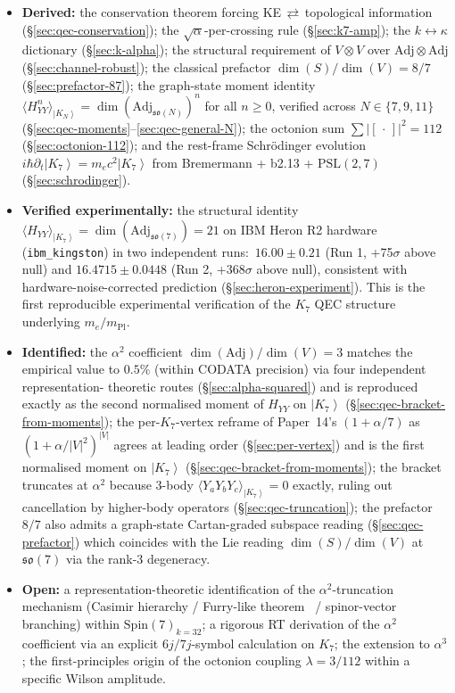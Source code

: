 \documentclass[11pt]{article}
\newcommand{\so}{\mathfrak{so}}
\newcommand{\Spin}{\mathrm{Spin}}
\newcommand{\Adj}{\mathrm{Adj}}
\newcommand{\ket}[1]{\left|#1\right\rangle}
\newcommand{\mPl}{m_{\mathrm{Pl}}}
\newcommand{\PSL}{\mathrm{PSL}}
\begin{document}
\begin{itemize}
\item \textbf{Derived:} the conservation theorem forcing
  KE\,$\rightleftarrows$\,topological information
  (\S\ref{sec:qec-conservation}); the $\sqrt{\alpha}$-per-crossing
  rule (\S\ref{sec:k7-amp}); the $k\leftrightarrow \kappa$ dictionary
  (\S\ref{sec:k-alpha}); the structural requirement of
  $V \otimes V$ over $\Adj \otimes \Adj$
  (\S\ref{sec:channel-robust}); the classical prefactor
  $\dim(S)/\dim(V) = 8/7$ (\S\ref{sec:prefactor-87}); the
  graph-state moment identity
  $\langle H_{YY}^n\rangle_{\ket{K_N}} = \dim(\Adj_{\so(N)})^n$ for all
  $n \geq 0$, verified across $N \in \{7, 9, 11\}$
  (\S\ref{sec:qec-moments}--\ref{sec:qec-general-N}); the
  octonion sum $\sum |[\,\cdot\,]|^2 = 112$
  (\S\ref{sec:octonion-112}); and the rest-frame Schr\"odinger
  evolution $i\hbar \partial_t \ket{K_7} = m_e c^2 \ket{K_7}$ from
  Bremermann + b2.13 + $\PSL(2,7)$ (\S\ref{sec:schrodinger}).
\item \textbf{Verified experimentally:} the structural identity
  $\langle H_{YY}\rangle_{\ket{K_7}} = \dim(\Adj_{\so(7)}) = 21$
  on IBM Heron R2 hardware (\texttt{ibm\_kingston}) in two
  independent runs:\ $16.00 \pm 0.21$ (Run 1, +75$\sigma$ above
  null) and $16.4715 \pm 0.0448$ (Run 2, +368$\sigma$ above null),
  consistent with hardware-noise-corrected prediction
  (\S\ref{sec:heron-experiment}).  This is the first reproducible
  experimental verification of the $K_7$ QEC structure underlying
  $m_e/\mPl$.
\item \textbf{Identified:} the $\alpha^2$ coefficient
  $\dim(\Adj)/\dim(V) = 3$ matches the empirical value to $0.5\%$
  (within CODATA precision) via four independent representation-
  theoretic routes (\S\ref{sec:alpha-squared}) and is reproduced
  exactly as the second normalised moment of $H_{YY}$ on $\ket{K_7}$
  (\S\ref{sec:qec-bracket-from-moments}); the per-$K_7$-vertex
  reframe of Paper~14's $(1+\alpha/7)$ as $(1 + \alpha/|V|^2)^{|V|}$
  agrees at leading order (\S\ref{sec:per-vertex}) and is the
  first normalised moment on $\ket{K_7}$
  (\S\ref{sec:qec-bracket-from-moments}); the bracket truncates at
  $\alpha^2$ because 3-body $\langle Y_aY_bY_c\rangle_{\ket{K_7}} = 0$
  exactly, ruling out cancellation by higher-body operators
  (\S\ref{sec:qec-truncation}); the prefactor $8/7$ also admits
  a graph-state Cartan-graded subspace reading
  (\S\ref{sec:qec-prefactor}) which coincides with the Lie reading
  $\dim(S)/\dim(V)$ at $\so(7)$ via the rank-3 degeneracy.
\item \textbf{Open:} a representation-theoretic identification of
  the $\alpha^2$-truncation mechanism (Casimir hierarchy /
  Furry-like theorem~\cite{furry1937} / spinor-vector branching) within
  $\Spin(7)_{k=32}$; a rigorous RT derivation of the $\alpha^2$
  coefficient via an explicit $6j/7j$-symbol calculation on $K_7$;
  the extension to $\alpha^3$; the first-principles origin of the
  octonion coupling $\lambda = 3/112$ within a specific Wilson
  amplitude.
\end{itemize}
\end{document}
